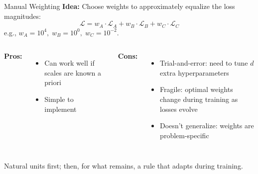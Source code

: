 \documentclass[aspectratio=169,11pt]{beamer}
\newcommand{\emphc}[1]{\textcolor{harvardcrimson}{#1}}
\begin{document}
\begin{frame}{Manual Weighting}
\small
\vspace{-0.1cm}
\textbf{Idea:} Choose weights to approximately equalize the loss magnitudes:
\[
    \mathcal{L} = w_A \cdot \mathcal{L}_A + w_B \cdot \mathcal{L}_B + w_C \cdot \mathcal{L}_C
\]
e.g., $w_A = 10^4,\; w_B = 10^0,\; w_C = 10^{-2}$.

\vspace{0.3cm}
\begin{columns}[T]
\textbf{Pros:}
\begin{itemize}
    \item Can work well if scales are known a priori
    \item Simple to implement
\end{itemize}

\textbf{Cons:}
\begin{itemize}
    \item \emphc{Trial-and-error}: need to tune $d$ extra hyperparameters
    \item \emphc{Fragile}: optimal weights change during training as losses evolve
    \item \emphc{Doesn't generalize}: weights are problem-specific
\end{itemize}
\end{columns}

\vspace{0.2cm}
\begin{alertblock}{Natural units first; then, for what remains, a rule that adapts during training.}
\end{alertblock}
\end{frame}
\end{document}
